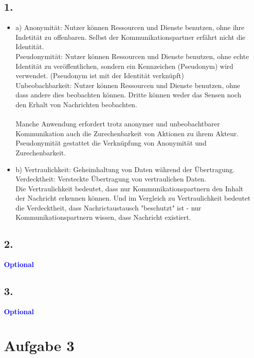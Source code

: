 \documentclass[a4paper,11pt]{scrartcl}
\newcommand{\opt}{\textcolor{blue}{\textbf{Optional}}}
\begin{document}
\subsection*{1.}
\begin{itemize}
\item{a)} 
Anonymität: Nutzer können Ressourcen und Dienste benutzen, ohne ihre 
Indetität zu offenbaren. Selbst der Kommunikationspartner erfährt nicht die Identität.\\
Pseudonymität: Nutzer können Ressourcen und Dienste benutzen, ohne echte Identität zu veröffentlichen, sondern ein Kennzeichen (Pseudonym) wird verwendet. (Pseudonym ist mit der Identität verknüpft) \\
Unbeobachbarkeit: Nutzer können Ressourcen und Dienste benutzen, ohne dass andere dies beobachten können. Dritte können weder das Sensen noch den Erhalt von Nachrichten beobachten.\\
\\
Manche Anwendung erfordert trotz anonymer und unbeobachtbarer Kommunikation auch
die Zurechenbarkeit von Aktionen zu ihrem Akteur. Pseudonymität
gestattet die Verknüpfung von Anonymität und Zurechenbarkeit.
\\
\item{b)} Vertraulichkeit: Geheimhaltung von Daten während der Übertragung. \\
Verdecktheit: Versteckte Übertragung von vertraulichen Daten. \\
Die Vertraulichkeit bedeutet, dass nur Kommunikationspartnern den Inhalt der Nachricht erkennen können. Und im Vergleich zu Vertraulichkeit bedeutet  die Verdecktheit, dass Nachrictaustausch "beschutzt" ist - nur Kommunikationspartnern wissen, dass Nachricht existiert.


\end{itemize}

\subsection*{2.}
\opt
\subsection*{3.}
\opt
 
\section*{Aufgabe 3}
\end{document}
